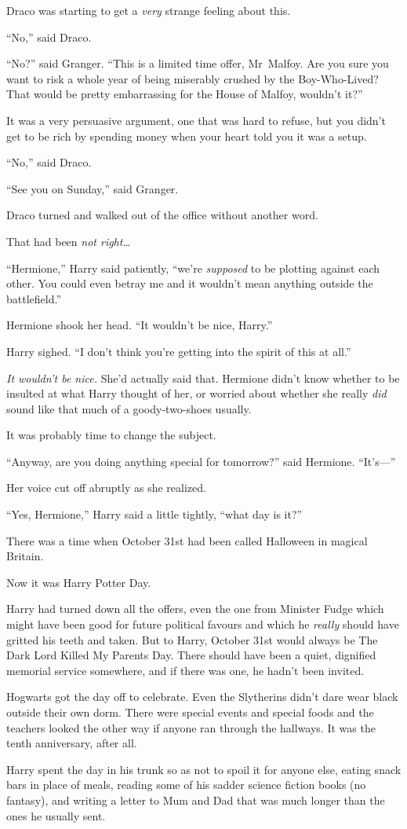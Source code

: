 Draco was starting to get a \emph{very} strange feeling about this.

“No,” said Draco.

“No?” said Granger. “This is a limited time offer, Mr~Malfoy. Are you sure you want to risk a whole year of being miserably crushed by the Boy-Who-Lived? That would be pretty embarrassing for the House of Malfoy, wouldn’t it?”

It was a very persuasive argument, one that was hard to refuse, but you didn’t get to be rich by spending money when your heart told you it was a setup.

“No,” said Draco.

“See you on Sunday,” said Granger.

Draco turned and walked out of the office without another word.

That had been \emph{not right…}

\later

“Hermione,” Harry said patiently, “we’re \emph{supposed} to be plotting against each other. You could even betray me and it wouldn’t mean anything outside the battlefield.”

Hermione shook her head. “It wouldn’t be nice, Harry.”

Harry sighed. “I don’t think you’re getting into the spirit of this at all.”

\emph{It wouldn’t be nice.} She’d actually said that. Hermione didn’t know whether to be insulted at what Harry thought of her, or worried about whether she really \emph{did} sound like that much of a goody-two-shoes usually.

It was probably time to change the subject.

“Anyway, are you doing anything special for tomorrow?” said Hermione. “It’s—”

Her voice cut off abruptly as she realized.

“Yes, Hermione,” Harry said a little tightly, “what day is it?”


There was a time when October 31st had been called Halloween in magical Britain.

Now it was Harry Potter Day.

Harry had turned down all the offers, even the one from Minister Fudge which might have been good for future political favours and which he \emph{really} should have gritted his teeth and taken. But to Harry, October 31st would always be The Dark Lord Killed My Parents Day. There should have been a quiet, dignified memorial service somewhere, and if there was one, he hadn’t been invited.

Hogwarts got the day off to celebrate. Even the Slytherins didn’t dare wear black outside their own dorm. There were special events and special foods and the teachers looked the other way if anyone ran through the hallways. It was the tenth anniversary, after all.

Harry spent the day in his trunk so as not to spoil it for anyone else, eating snack bars in place of meals, reading some of his sadder science fiction books (no fantasy), and writing a letter to Mum and Dad that was much longer than the ones he usually sent.
